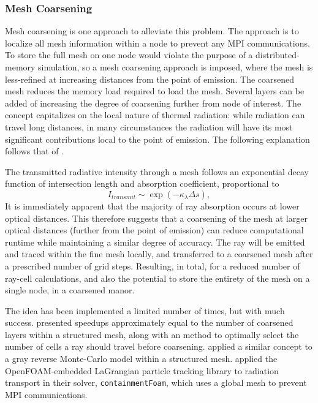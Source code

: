 \subsubsection{Mesh Coarsening}
Mesh coarsening is one approach to alleviate this problem. The approach is to localize all mesh information within a node to prevent any MPI communications.
To store the full mesh on one node would violate the purpose of a distributed-memory simulation, so a mesh coarsening approach is imposed, where the mesh is less-refined at increasing distances from the point of emission.
The coarsened mesh reduces the memory load required to load the mesh. Several layers can be added of increasing the degree of coarsening further from node of interest. The concept capitalizes on the local nature of thermal radiation: 
while radiation can travel long distances, in many circumstances the radiation will have its most significant contributions local to the point of emission.
The following explanation follows that of \citet{Silvestri2019ASimulation}.

The transmitted radiative intensity through a mesh follows an exponential decay function of intersection length and absorption coefficient, proportional to
\begin{equation}
     I_{transmit} \sim \exp{\left(-\kappa{}_\lambda{}\Delta{s}\right)},
    \label{eq:specular_reflection}
\end{equation}
It is immediately apparent that the majority of ray absorption occurs at lower optical distances. This therefore suggests that a coarsening of the mesh at larger optical distances (further from the point of emission) can reduce computational runtime while maintaining a similar degree of accuracy.
The ray will be emitted and traced within the fine mesh locally, and transferred to a coarsened mesh after a prescribed number of grid steps.
Resulting, in total, for a reduced number of ray-cell calculations, and also the potential to store the entirety of the mesh on a single node, in a coarsened manor. 

The idea has been implemented a limited number of times, but with much success. \citet{Silvestri2019ASimulation} presented speedups approximately equal to the number of coarsened layers within a structured mesh, along with an method to optimally select the number of cells a ray should travel before coarsening. 
\citet{Humphrey2015ATracing} applied a similar concept to a gray reverse Monte-Carlo model within a structured mesh. \citet{Kelm2021TheTransport} applied the OpenFOAM-embedded LaGrangian particle tracking library to radiation transport in their solver, \verb|containmentFoam|, which uses a global mesh to prevent MPI communications.

